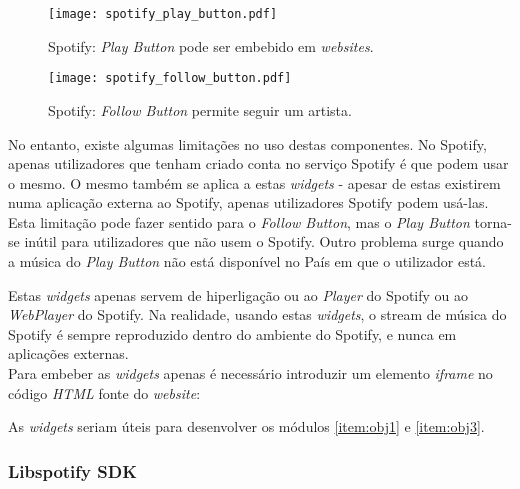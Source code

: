       \begin{figure}
        \begin{center}
          \texttt{[image: spotify\_play\_button.pdf]}
        \end{center}
        \caption{Spotify: \emph{Play Button} pode ser embebido em \emph{websites}.}
        \label{fig:spotify_play_button}
      \end{figure}

      \begin{figure}
        \begin{center}
          \texttt{[image: spotify\_follow\_button.pdf]}
        \end{center}
        \caption{Spotify: \emph{Follow Button} permite seguir um artista.}
        \label{fig:spotify_follow_button}
      \end{figure}

      No entanto, existe algumas limitações no uso destas componentes.
      No Spotify, apenas utilizadores que tenham criado conta no serviço Spotify é que podem usar o mesmo.
      O mesmo também se aplica a estas \emph{widgets} - apesar de estas existirem numa aplicação externa ao Spotify, apenas utilizadores Spotify podem usá-las.
      Esta limitação pode fazer sentido para o \emph{Follow Button}, mas o \emph{Play Button} torna-se inútil para utilizadores que não usem o Spotify.
      Outro problema surge quando a música do \emph{Play Button} não está disponível no País em que o utilizador está.

      Estas \emph{widgets} apenas servem de hiperligação ou ao \emph{Player} do Spotify ou ao \emph{WebPlayer} do Spotify.
      Na realidade, usando estas \emph{widgets}, o stream de música do Spotify é sempre reproduzido dentro do ambiente do Spotify, e nunca em aplicações externas. \\

      Para embeber as \emph{widgets} apenas é necessário introduzir um elemento \emph{iframe} no código \emph{HTML} fonte do \emph{website}:

      

      As \emph{widgets} seriam úteis para desenvolver os módulos \ref{item:obj1} e \ref{item:obj3}.


    \subsubsection{Libspotify SDK} %
    \label{ssub:libspotify_sdk}
    
